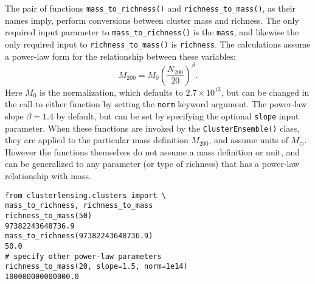 \documentclass{emulateapj}
\newcommand{\code}{\lstinline[style=codeintext]}
\begin{document}
The pair of functions \code{mass_to_richness()} and \code{richness_to_mass()}, as their names imply, perform conversions between cluster mass and richness. The only required input parameter to \code{mass_to_richness()} is the \code{mass}, and likewise the only required input to \code{richness_to_mass()} is \code{richness}. The calculations assume a power-law form for the relationship between these variables:
\begin{equation}\label{massrich}
M_{200} = M_0 \left( \frac{N_{200}}{20} \right) ^ \beta.
\end{equation}
Here $M_0$ is the normalization, which defaults to $2.7 \times 10^{13}$, but can be changed in the call to either function by setting the \code{norm} keyword argument. The power-law slope $\beta = 1.4$ by default, but can be set by specifying the optional \code{slope} input parameter. When these functions are invoked by the \code{ClusterEnsemble()} class, they are applied to the particular mass definition $M_{200}$, and assume units of $M_{\odot}$. However the functions themselves do not assume a mass definition or unit, and can be generalized to any parameter (or type of richness) that has a power-law relationship with mass.
\begin{lstlisting}
from clusterlensing.clusters import \
mass_to_richness, richness_to_mass
richness_to_mass(50)
97382243648736.9
mass_to_richness(97382243648736.9)
50.0
# specify other power-law parameters
richness_to_mass(20, slope=1.5, norm=1e14)
100000000000000.0
\end{lstlisting}
\end{document}

